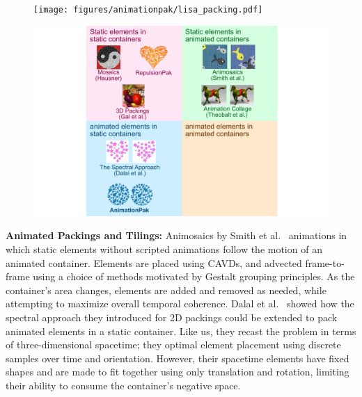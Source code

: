 \begin{figure}[t]
\centering
\texttt{[image: figures/animationpak/lisa\_packing.pdf]} 
\caption[An animated packing of copies of Lisa Simpson]
{\label{fig_animationpak_lisa_packing} 
}
\end{figure}

\begin{figure}[h]
\centering
\includegraphics[width=1.0\textwidth]{figures/animationpak/2x2.pdf} 
\caption[A classification of animated packings]
{\label{fig_animationpak_categorization} 
}
\end{figure}

\textbf{Animated Packings and Tilings:}
Animosaics by Smith et al.~\cite{Smith2005}  animations 
in which static elements without scripted
animations follow the motion of an animated container.  Elements are
placed using CAVDs, and advected frame-to-frame using a choice of methods
motivated by Gestalt grouping principles.
As the container's area changes, elements are added and removed as needed,
while attempting to maximize overall temporal coherence.
Dalal et al.~\cite{Dalal2006} showed how the spectral approach they
introduced for 2D packings could be extended 
to pack animated elements in a static container.  Like us, they recast
the problem in terms of three-dimensional spacetime; they  optimal
element placement using discrete samples over time and orientation.
However, their spacetime elements have fixed
shapes and are made to fit together using only translation and rotation, 
limiting their ability to consume the container's negative space.

